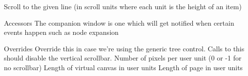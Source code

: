 \label{wxremotelyscrolledtreectrlscrolltoline}


Scroll to the given line (in scroll units where each unit is
the height of an item)


\label{wxremotelyscrolledtreectrlsetcompanionwindow}


Accessors
The companion window is one which will get notified when certain
events happen such as node expansion


\label{wxremotelyscrolledtreectrlsetscrollbars}


Overrides
Override this in case we're using the generic tree control.
Calls to this should disable the vertical scrollbar.
Number of pixels per user unit (0 or -1 for no scrollbar)
Length of virtual canvas in user units
Length of page in user units

